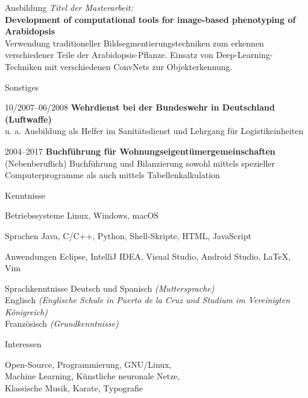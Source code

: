 \documentclass[11pt,a4paper,oneside,final]{scrartcl}
\begin{document}
\begin{cv}
\begin{cvlist}{Ausbildung}
            \textit{Titel der Masterarbeit:}\\[0.5em]
            \textbf{Development of computational tools for image-based phenotyping of Arabidopsis}\\
            Verwendung traditioneller Bildsegmentierungstechniken zum erkennen verschiedener Teile der Arabidopsis-Pflanze. Einsatz von Deep-Learning-Techniken mit verschiedenen ConvNets zur Objekterkennung.

        \sepspace
    \end{cvlist}

    \begin{cvlist}{Sonstiges}
        \item[10/2007--06/2008] \textbf{Wehrdienst bei der Bundeswehr in Deutschland (Luftwaffe)}\\
            u. a. Ausbildung als Helfer im Sanitätsdienst und Lehrgang für Logistikeinheiten
        \item[2004--2017] \textbf{Buchführung für Wohnungseigentümergemeinschaften}\\
            (Nebenberuflich) Buchführung und Bilanzierung sowohl mittels spezieller Computerprogramme als auch mittels Tabellenkalkulation

        \sepspace
    \end{cvlist}

    \begin{cvlist}{Kenntnisse}
        \item[Betriebssysteme] Linux, Windows, macOS
        \item[Sprachen] Java, C/C++, Python, Shell-Skripte, HTML, JavaScript
        \item[Anwendungen] Eclipse, IntelliJ IDEA, Visual Studio, Android Studio, LaTeX, Vim
        \item[Sprachkenntnisse] Deutsch und Spanisch \textit{(Muttersprache)}\\
            Englisch \textit{(Englische Schule in Puerto de la Cruz und Studium im Vereinigten Königreich)}\\
            Französisch \textit{(Grundkenntnisse)}

        \sepspace
    \end{cvlist}

    \begin{cvlist}{Interessen}
        \item Open-Source, Programmierung, GNU/Linux,\\
            Machine Learning, Künstliche neuronale Netze,\\
            Klassische Musik, Karate, Typografie
    \end{cvlist}

    \date{15.~März~2018}

\end{cv}
\end{document}
